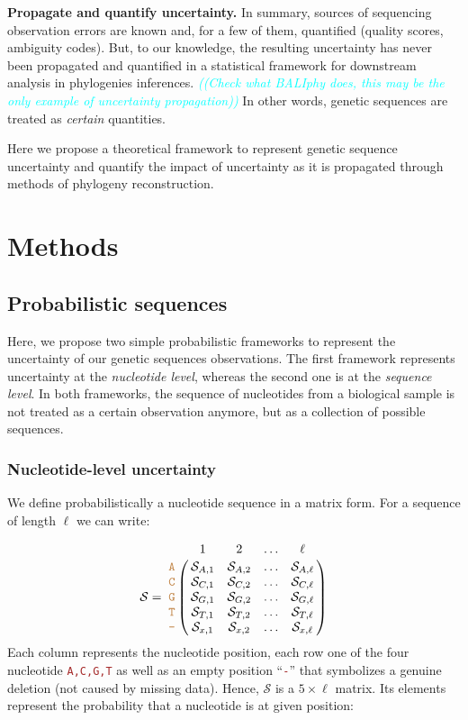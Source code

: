 \documentclass[10pt]{article}
\newcommand{\comment}[1]{\textsl{\textcolor{cyan}{((#1))}}}
\newcommand{\sq}[1]{\texttt{\textcolor{brown}{#1}}}
\newcommand{\nps}{\mathcal{S}} %
\begin{document}
\textbf{Propagate and quantify uncertainty.}
In summary, sources of sequencing observation errors are known and, for a few of them, quantified (quality scores, ambiguity codes).
But, to our knowledge, the resulting uncertainty has never been propagated and quantified in a statistical framework for downstream analysis in  phylogenies inferences.
\comment{Check what BALIphy does, this may be the only example of uncertainty propagation}
In other words, genetic sequences are treated as \emph{certain} quantities.

Here we propose a theoretical framework to represent genetic sequence uncertainty and quantify the impact of uncertainty as it is propagated through methods of phylogeny reconstruction. 







\section{Methods}



\subsection{Probabilistic sequences}

Here, we propose two simple probabilistic frameworks to represent the uncertainty of our genetic sequences observations.
The first framework represents uncertainty at the \emph{nucleotide level}, whereas the second one is at the \emph{sequence level}.
In both frameworks, the sequence of nucleotides from a biological sample is not treated as a certain observation anymore, but as a collection of possible sequences.


\subsubsection{Nucleotide-level uncertainty}
 
We define probabilistically a nucleotide sequence in a matrix form. For a sequence of length $\ell$ we can write:

$$\nps = \bordermatrix{   & 1 & 2 & \ldots & \ell \cr
                \sq{A} & \nps_{A, 1} & \nps_{A, 2} & \ldots & \nps_{A, \ell} \cr
                \sq{C} & \nps_{C, 1} & \nps_{C, 2} & \ldots & \nps_{C, \ell} \cr
                \sq{G} & \nps_{G, 1} & \nps_{G, 2} & \ldots & \nps_{G, \ell} \cr
                \sq{T} & \nps_{T, 1} & \nps_{T, 2} & \ldots & \nps_{T, \ell} \cr 
                \sq{-} & \nps_{x, 1} & \nps_{x, 2} & \ldots & \nps_{x, \ell} \cr 
}$$
Each column represents the nucleotide position, each row one of the four nucleotide \sq{A,C,G,T} as well as an empty position ``\sq{-}'' that symbolizes a genuine deletion (not caused by missing data).
Hence, $\nps$ is a $5\times\ell$ matrix. Its elements represent the probability that a nucleotide is at given position:
\end{document}
